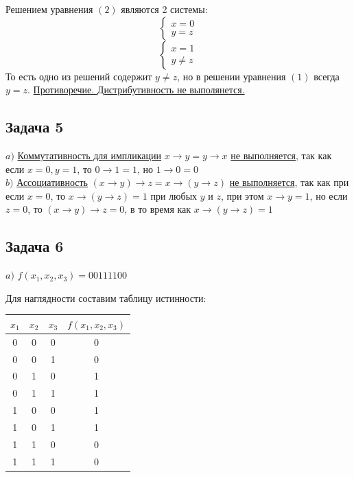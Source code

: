 \documentclass[a4paper,14pt]{article} %
\begin{document}
Решением уравнения $(2)$ являются 2 системы:
 \begin{equation}\begin{cases}
  x = 0\\
  y =z
\end{cases} \end{equation}
 \begin{equation}\begin{cases}
  x = 1\\
  y \neq z
\end{cases} \end{equation}
 То есть одно из решений содержит $y \neq z$, но в решении уравнения $(1)$ всегда $y=z$.
\underline{Противоречие. Дистрибутивность не выполянется.}
\newpage
\begin{center}
\subsection{Задача 5}
\end{center}

$a)$ \underline{Коммутативность для импликации} $x\rightarrow y =y\rightarrow x$ \underline{не выполняется}, так как если $x=0, y=1$, то $0\rightarrow 1=1$, но $1\rightarrow 0=0$ \\

$b)$ \underline{Ассоциативность} $(x\rightarrow y)\rightarrow z = x\rightarrow (y\rightarrow z) $ \underline{не выполняется}, так как при если $x=0$, то $x\rightarrow (y\rightarrow z)=1$ при любых $y$ и $z$, при этом $x\rightarrow y=1$, но если $z=0$, то $(x\rightarrow y)\rightarrow z =0$, в то время как $x\rightarrow (y\rightarrow z)=1$ \\

\subsection{Задача 6}

$a)$ $f(x_1,x_2,x_3)=00111100$

Для наглядности составим  таблицу истинности:
\begin{center}
\begin{tabular}{|c|c|c|c|}
\hline
$x_1$ & $x_2$ & $x_3$ & $f(x_1,x_2,x_3)$ \\
\hline
0 & 0 & 0 & 0 \\
\hline
0 & 0 & 1 & 0 \\
\hline
0 & 1 & 0 & 1 \\
\hline
0 & 1 & 1 & 1 \\
\hline
1 & 0 & 0 & 1 \\
\hline
1 & 0 & 1 & 1 \\
\hline
1 & 1 & 0 & 0 \\
\hline
1 & 1 & 1 & 0 \\
\hline
\end{tabular}
\end{center}
\end{document}
